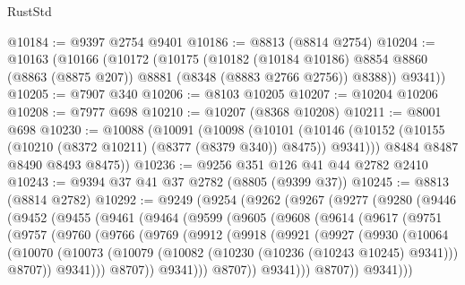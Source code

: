 \begin{lexlean}{RustStd}
\begin{coremodule}
{\begin{coremodule}
{{{{{{{{{{{{{{{{{{{{{{{{{{{{{{{{{{{{{{{{{{{{{{{{{{@10184 := @9397 @2754 @9401
@10186 := @8813 (@8814 @2754)
@10204 := @10163
    (@10166
      (@10172
        (@10175
          (@10182
            (@10184 @10186)
            @8854
            @8860
            (@8863 (@8875 @207))
            @8881
            (@8348 (@8883 @2766 @2756))
            @8388))
        @9341))
@10205 := @7907 @340
@10206 := @8103 @10205
@10207 := @10204 @10206
@10208 := @7977 @698
@10210 := @10207 (@8368 @10208)
@10211 := @8001 @698
@10230 := @10088
    (@10091
      (@10098
        (@10101 (@10146 (@10152 (@10155 (@10210 (@8372 @10211) (@8377 (@8379 @340)) @8475)) @9341)))
        @8484
        @8487
        @8490
        @8493
        @8475))
@10236 := @9256 @351 @126 @41 @44 @2782 @2410
@10243 := @9394 @37 @41 @37 @2782 (@8805 (@9399 @37))
@10245 := @8813 (@8814 @2782)
@10292 := @9249
    (@9254
      (@9262
        (@9267
          (@9277
            (@9280
              (@9446
                (@9452
                  (@9455
                    (@9461
                      (@9464
                        (@9599
                          (@9605
                            (@9608
                              (@9614
                                (@9617
                                  (@9751
                                    (@9757
                                      (@9760
                                        (@9766
                                          (@9769
                                            (@9912
                                              (@9918
                                                (@9921
                                                  (@9927
                                                    (@9930
                                                      (@10064
                                                        (@10070
                                                          (@10073
                                                            (@10079
                                                              (@10082
                                                                (@10230
                                                                  (@10236 (@10243 @10245) @9341)))
                                                              @8707))
                                                          @9341)))
                                                    @8707))
                                                @9341)))
                                          @8707))
                                      @9341)))
                                @8707))
                            @9341)))
}}}}}}}}}}}}}}}}}}}}}}}}}}}}}}}}}}}}}}}}}}}}}}}}}}
\end{coremodule}}
\end{coremodule}
\end{lexlean}
